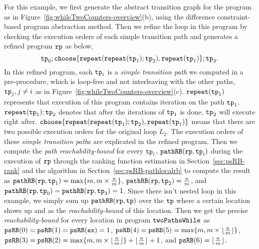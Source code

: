 For this example, we first
generate the abstract transition graph for the program as in Figure~\ref{fig:whileTwoCounters-overview}(b), using the difference constraint-based program abstraction method.
Then we refine the loop in this program by checking the 
execution orders of each simple transition path and
generates a refined program $\mathtt{rp}$ as below,
% 
\[ \tpath_0 ; 
 \rpchoose{
    \rprepeat(\rprepeat(\tpath_1); \tpath_2), 
   \rprepeat(\tpath_1)}; \tpath_3.
\]
In this refined program,
each $\mathtt{tp}_i$ is a \emph{simple transition path} we computed in a pre-procedure, which is loop-free and not interleaving with the other paths, $\mathtt{tp}_j, j \neq i$ as in Figure~\ref{fig:whileTwoCounters-overview}(c).
$\mathtt{repeat}(\mathtt{tp}_1)$ represents that execution of this program contains iteration on the path $\mathtt{tp}_1$.
$\mathtt{repeat}(\mathtt{tp}_1); \mathtt{tp}_2$ denotes that after the iterations of $\mathtt{tp}_1$ is done,
$\mathtt{tp}_2$ will execute right after.
$\rpchoose{
    \rprepeat(\rprepeat(\tpath_1); \tpath_2), 
   \rprepeat(\tpath_1)}$ means that there are two possible execution orders for the original loop $L_2$.
The execution orders of these \emph{simple transition path}s are explicated in the refined program.
Then we compute the \emph{path reachability-bound} for every $\mathtt{tp}_i$,
$\mathtt{pathRB}(\mathtt{rp}, \mathtt{tp}_i)$ during the execution of $\mathtt{rp}$ through the ranking function estimation in Section~\ref{sec:psRB-rank} and the algorithm in Section~\ref{sec:psRB-pathlocalrb} to compute the result as
$\mathtt{pathRB}(\mathtt{rp}, \mathtt{tp}_1) = \max\{m, m \times \frac{n}{m} \}$,
$\mathtt{pathRB}(\mathtt{rp}, \mathtt{tp}_2) = \frac{n}{m}$,
and $\mathtt{pathRB}(\mathtt{rp}, \mathtt{tp}_0) = \mathtt{pathRB}(\mathtt{rp}, \mathtt{tp}_3) = 1$.
Since there isn't nested loop in this example, we simply sum up $\mathtt{pathRB}(\mathtt{rp}, \mathtt{tp})$ over the $\mathtt{tp}$ where a certain location shows up
and as the \emph{reachability-bound} of this location.
Then we get the precise \emph{reachability-bound} for every location in program $\mathtt{twoPathsWhile}$ as
$\mathtt{psRB}(0) = \mathtt{psRB}(1) = \mathtt{psRB}(\mathtt{ex}) = 1$,
$\mathtt{psRB}(4) = \mathtt{psRB}(5) = \max\{m, m \times \lfloor\frac{n}{m}\rfloor\}$,
$\mathtt{psRB}(3) = \mathtt{psRB}(2) = \max\{m, m \times \lfloor\frac{n}{m}\rfloor\} + \lfloor\frac{n}{m}\rfloor + 1 $,
and $\mathtt{psRB}(6) = \lfloor\frac{n}{m}\rfloor$.
%
